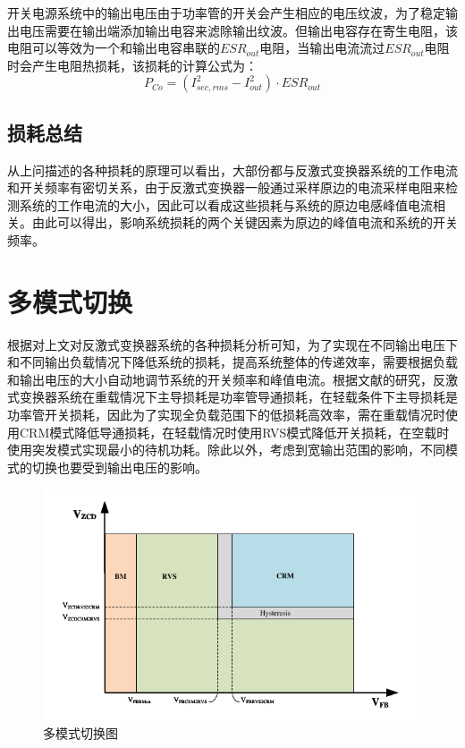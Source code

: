 开关电源系统中的输出电压由于功率管的开关会产生相应的电压纹波，为了稳定输出电压需要在输出端添加输出电容来滤除输出纹波。但输出电容存在寄生电阻，该电阻可以等效为一个和输出电容串联的$ESR_{out}$电阻，当输出电流流过$ESR_{out}$电阻时会产生电阻热损耗，该损耗的计算公式为：
\begin{equation}
    \label{eq:ESR损耗公式}
    P_{Co} = (I_{sec,rms}^2 - I_{out}^2) \cdot ESR_{out}
\end{equation}

\subsection{损耗总结}

从上问描述的各种损耗的原理可以看出，大部份都与反激式变换器系统的工作电流和开关频率有密切关系，由于反激式变换器一般通过采样原边的电流采样电阻来检测系统的工作电流的大小，因此可以看成这些损耗与系统的原边电感峰值电流相关。由此可以得出，影响系统损耗的两个关键因素为原边的峰值电流和系统的开关频率。

\section{多模式切换}
\label{sec:多模式切换}
根据对上文对反激式变换器系统的各种损耗分析可知，为了实现在不同输出电压下和不同输出负载情况下降低系统的损耗，提高系统整体的传递效率，需要根据负载和输出电压的大小自动地调节系统的开关频率和峰值电流。根据文献的研究，反激式变换器系统在重载情况下主导损耗是功率管导通损耗，在轻载条件下主导损耗是功率管开关损耗，因此为了实现全负载范围下的低损耗高效率，需在重载情况时使用CRM模式降低导通损耗，在轻载情况时使用RVS模式降低开关损耗，在空载时使用突发模式实现最小的待机功耗。除此以外，考虑到宽输出范围的影响，不同模式的切换也要受到输出电压的影响。

\begin{figure}[htbp] 
    \centering
    \includegraphics[width=0.8\linewidth]{figures/模式切换1.pdf}
    \caption{多模式切换图}
    \label{fig:模式切换1}
\end{figure}

